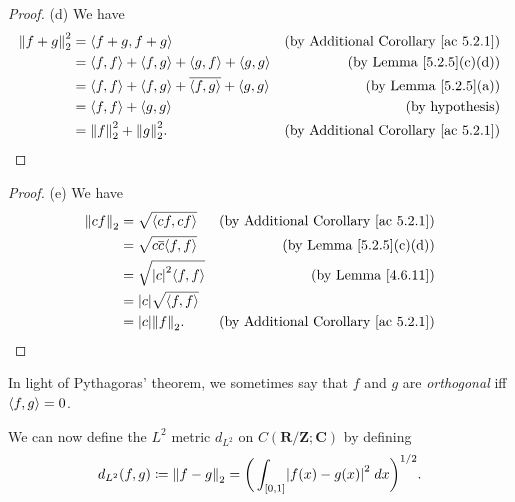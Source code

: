 \begin{proof}{(d)}
    We have
    \begin{align*}
        \norm*{f + g}_2^2 & = \inner*{f + g, f + g}                                                    & \text{(by Additional Corollary \ref{ac 5.2.1})} \\
                          & = \inner*{f, f} + \inner*{f, g} + \inner*{g, f} + \inner*{g, g}            & \text{(by Lemma \ref{5.2.5}(c)(d))}             \\
                          & = \inner*{f, f} + \inner*{f, g} + \overline{\inner*{f, g}} + \inner*{g, g} & \text{(by Lemma \ref{5.2.5}(a))}                \\
                          & = \inner*{f, f} + \inner*{g, g}                                            & \text{(by hypothesis)}                          \\
                          & = \norm*{f}_2^2 + \norm*{g}_2^2.                                           & \text{(by Additional Corollary \ref{ac 5.2.1})}
    \end{align*}
\end{proof}

\begin{proof}{(e)}
    We have
    \begin{align*}
        \norm*{cf}_2 & = \sqrt{\inner*{cf, cf}}              & \text{(by Additional Corollary \ref{ac 5.2.1})} \\
                     & = \sqrt{c \overline{c} \inner*{f, f}} & \text{(by Lemma \ref{5.2.5}(c)(d))}             \\
                     & = \sqrt{\abs*{c}^2 \inner*{f, f}}     & \text{(by Lemma \ref{4.6.11})}                  \\
                     & = \abs*{c} \sqrt{\inner*{f, f}}                                                         \\
                     & = \abs*{c} \norm*{f}_2.               & \text{(by Additional Corollary \ref{ac 5.2.1})}
    \end{align*}
\end{proof}

\begin{note}
    In light of Pythagoras' theorem, we sometimes say that \(f\) and \(g\) are \emph{orthogonal} iff \(\inner*{f, g} = 0\).
\end{note}

\begin{additional corollary}\label{ac 5.2.2}
We can now define the \(L^2\) metric \(d_{L^2}\) on \(C(\mathbf{R} / \mathbf{Z} ; \mathbf{C})\) by defining
\[
    d_{L^2}(f, g) \coloneqq \norm*{f - g}_2 = \bigg(\int_{[0, 1]} \abs*{f(x) - g(x)}^2 \; dx\bigg)^{1 / 2}.
\]
\end{additional corollary}

